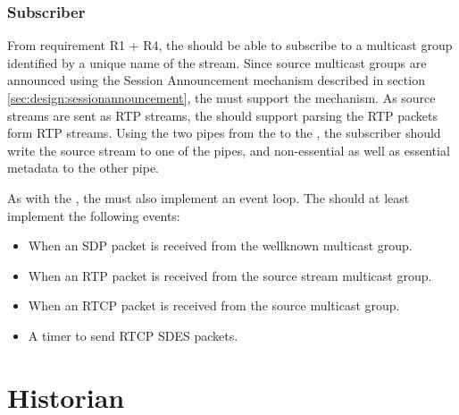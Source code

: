 \subsubsection{Subscriber} \label{sec:design:subscriber}
From requirement R1 + R4, the \sub{} should be able to subscribe to a multicast group identified by a unique name of the stream. Since source multicast groups are announced using the Session Announcement mechanism described in section \ref{sec:design:sessionannouncement}, the \sub{} must support the mechanism. As source streams are sent as RTP streams, the \sub{} should support parsing the RTP packets form RTP streams. Using the two pipes from the \sub{} to the \con{}, the subscriber should write the source stream to one of the pipes, and non-essential as well as essential metadata to the other pipe.

As with the \pub{}, the \sub{} must also implement an event loop. The \sub{} should at least implement the following events:

\begin{itemize}
	\item When an SDP packet is received from the wellknown multicast group.
	\item When an RTP packet is received from the source stream multicast group.
	\item When an RTCP packet is received from the source multicast group.
	\item A timer to send RTCP SDES packets.
\end{itemize}



\section{Historian}




